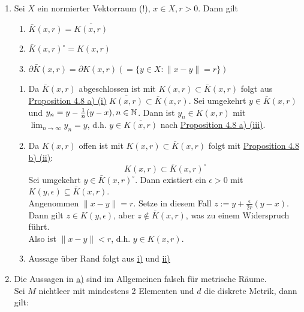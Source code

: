 \begin{beispiel} \label{bsp:1-4.11}
	\begin{enumerate}[label=\alph*\upshape)]
		\item \label{bsp:1-4.11.a} Sei $X$ ein normierter Vektorraum (!), $x \in X, r > 0$. Dann gilt
			\begin{enumerate}
				\item $\bar K(x, r) = \overline{K(x, r)}$ \label{bsp:1-4.11.a.i}
				\item $\bar K(x, r)^{\circ} = K(x, r)$ \label{bsp:1-4.11.a.ii}
				\item $\partial \bar K(x, r) = \partial K(x, r) (= \{ y \in X: \| x - y \| = r \} ) $	\label{bsp:1-4.11.a.iii}
			\end{enumerate}
			\begin{beweis}
				\begin{enumerate}
					\item Da $ \bar K(x, r)$ abgeschlossen ist mit $K(x, r) \subset \bar K(x, r)$ folgt aus \hyperref[prop:1-4.8.a1]{Proposition 4.8  a) (i)} $\overline{K(x, r)} \subset \bar K(x, r)$.
						Sei umgekehrt $y \in \bar K(x, r)$ und $y_{n} = y - \frac{1}{n} (y - x), n \in \mathbb{N}$. Dann ist $y_{n} \in K(x, r)$ mit $\lim_{n \rightarrow \infty} y_{n} = y$, d.h. $y \in \overline{K(x, r)}$ nach \hyperref[prop:1-4.8.a3]{Proposition 4.8 a) (iii)}.
					\item Da $K(x, r)$ offen ist mit $K(x, r) \subset \bar K(x, r)$ folgt mit \hyperref[prop:1-4.8.b2]{Proposition 4.8 b) (ii)}: 
						\[ K(x, r) \subset \bar K(x, r)^{\circ} \]
						Sei umgekehrt $y \in \bar K(x, r)^{\circ}$. Dann existiert ein $\epsilon > 0$ mit $K(y, \epsilon) \subseteq \bar K(x, r)$. \\
						Angenommen $\| x - y \| = r$. Setze in diesem Fall $z := y + \frac{\epsilon}{2 r} (y - x)$. Dann gilt $z \in K(y, \epsilon)$, aber $z \notin \bar K(x, r)$, was zu einem Widerspruch führt. \\
						Also ist $\| x - y \| < r$, d.h. $y \in K(x, r)$.
					\item Aussage über Rand folgt aus \hyperref[bsp:1-4.11.a.i]{i)} und \hyperref[bsp:1-4.11.a.ii]{ii)}		
				\end{enumerate}
			\end{beweis}
		\item Die Aussagen in \hyperref[bsp:1-4.11.a]{a)} sind im Allgemeinen falsch für metrische Räume. \\
			Sei $M$ nichtleer mit mindestens 2 Elementen und $d$ die diskrete Metrik, dann gilt:

\end{enumerate}
\end{beispiel}
